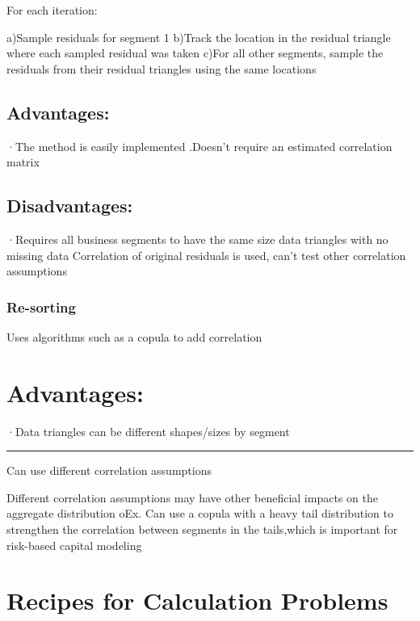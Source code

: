 \documentclass[
]{article}
\begin{document}
For each iteration:

a)Sample residuals for segment 1 b)Track the location in the residual
triangle where each sampled residual was taken c)For all other segments,
sample the residuals from their residual triangles using the same
locations

\subsection{Advantages:}\label{advantages-2}

·The method is easily implemented .Doesn't require an estimated
correlation matrix

\subsection{Disadvantages:}\label{disadvantages-1}

·Requires all business segments to have the same size data triangles
with no missing data Correlation of original residuals is used, can't
test other correlation assumptions

\subsubsection{Re-sorting}\label{re-sorting}

Uses algorithms such as a copula to add correlation

\section{Advantages:}\label{advantages-3}

·Data triangles can be different shapes/sizes by segment

\begin{center}\rule{0.5\linewidth}{0.5pt}\end{center}

Can use different correlation assumptions

Different correlation assumptions may have other beneficial impacts on
the aggregate distribution oEx. Can use a copula with a heavy tail
distribution to strengthen the correlation between segments in the
tails,which is important for risk-based capital modeling

\section{Recipes for Calculation
Problems}\label{recipes-for-calculation-problems-6}
\end{document}
